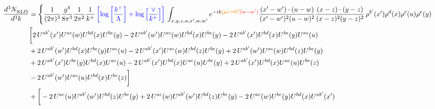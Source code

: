 \documentclass[aps,prd,amsmath,amssymb,nofootinbib]{revtex4-2}
\numberwithin{equation}{section}
\begin{document}
\begin{align}
   \frac{d^{3}N_{\rm NLO}^{\rm}}{d^{3}k}  & =  \Bigg\{\frac{1}{(2\pi)^{3}}\frac{g^{4}}{8\pi^{3}}\frac{1}{2\pi^{2}} \frac{1}{k^{+}}\,{\color{blue}\left[\log{\left[\frac{k^{+}}{\Lambda}\right]}+\log{\left[\frac{\vee}{k^{+}}\right]}\right]}\,\int_{x,y,z,u,x^{\prime},w,w^{\prime}}e^{-ik{\color{orange}\cancel{(w^{\prime}-w)}}{\color{red}(w-w^{\prime})}}\frac{(x^{\prime}-w^{\prime})\cdot (u-w)}{(x^{\prime}-w^{\prime})^{2} (u-w)^{2}} \frac{(x-z)\cdot (y-z)}{(x-z)^{2}(y-z)^{2}}\,\rho^{b^{\prime}}(x^{\prime})\rho^{d}(x)\rho^{c}(u)\rho^{e}(y)\notag \\ & \bigg[2\,U^{ab'}(x')U^{ac}(w)U^{bd}(x)U^{be}(y) -2\, U^{ab'}(w')U^{ac}(w)U^{bd}(x)U^{be}(y) - 2\,U^{ab'}(x')U^{bd}(x)U^{be}(y)U^{ac}(u) \notag \\  & + 2\, U^{ab'}(w')U^{bd}(x)U^{be}(y)U^{ac}(u)-2\,U^{ab'}(x')U^{ac}(w)U^{bd}(z)U^{be}(y) + 2\,U^{ab'}(w')U^{ac}(w)U^{bd}(z)U^{be}(y) \notag \\ &+2\,U^{ab'}(x')U^{be}(y)U^{bd}(x)U^{ac}(u) -2\,U^{ab'}(x')U^{bd}(x)U^{ac}(u)U^{be}(y) +2\, U^{ab'}(x')U^{bd}(x)U^{ac}(u)U^{be}(z) \notag \\ & - 2\,U^{ab'}(w')U^{ac}(u)U^{bd}(x)U^{be}(z)\bigg]\notag \\ & + \bigg[-2\,U^{ac}(u)U^{ab'}(w')U^{bd}(z)U^{be}(y) + 2\,U^{ac}(w)U^{ab'}(w')U^{bd}(z)U^{be}(y) - 2\,U^{ac}(w)U^{be}(y)U^{bd}(x)U^{ab'}(x') \notag \\

\end{align}
\end{document}
